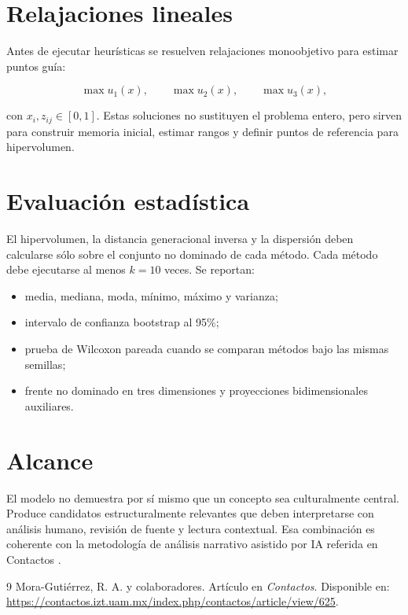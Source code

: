 \documentclass[11pt]{article}
\begin{document}
\section{Relajaciones lineales}

Antes de ejecutar heurísticas se resuelven relajaciones monoobjetivo para estimar puntos guía:

\[
\max u_1(x),\qquad \max u_2(x),\qquad \max u_3(x),
\]

con $x_i,z_{ij}\in[0,1]$. Estas soluciones no sustituyen el problema entero, pero sirven para construir memoria inicial, estimar rangos y definir puntos de referencia para hipervolumen.

\section{Evaluación estadística}

El hipervolumen, la distancia generacional inversa y la dispersión deben calcularse sólo sobre el conjunto no dominado de cada método. Cada método debe ejecutarse al menos $k=10$ veces. Se reportan:

\begin{itemize}
    \item media, mediana, moda, mínimo, máximo y varianza;
    \item intervalo de confianza bootstrap al 95\%;
    \item prueba de Wilcoxon pareada cuando se comparan métodos bajo las mismas semillas;
    \item frente no dominado en tres dimensiones y proyecciones bidimensionales auxiliares.
\end{itemize}

\section{Alcance}

El modelo no demuestra por sí mismo que un concepto sea culturalmente central. Produce candidatos estructuralmente relevantes que deben interpretarse con análisis humano, revisión de fuente y lectura contextual. Esa combinación es coherente con la metodología de análisis narrativo asistido por IA referida en Contactos \cite{contactos625}.

\begin{thebibliography}{9}
Mora-Gutiérrez, R. A. y colaboradores. Artículo en \emph{Contactos}. Disponible en: \url{https://contactos.izt.uam.mx/index.php/contactos/article/view/625}.
\end{thebibliography}


\end{document}
